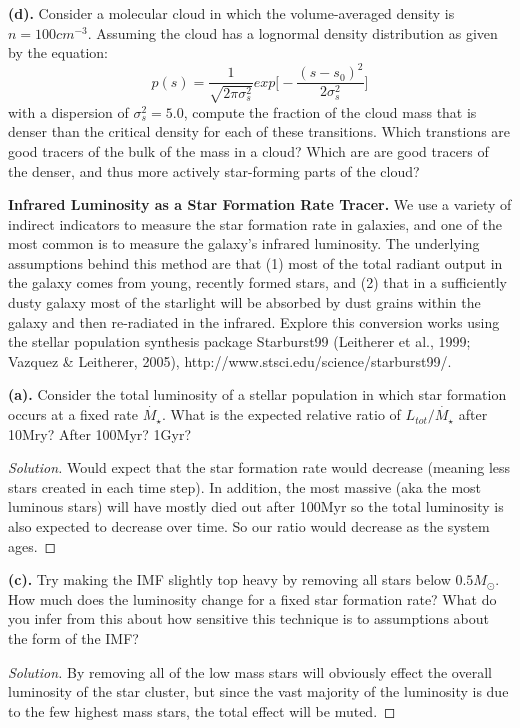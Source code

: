 \documentclass[10pt]{article}
\newenvironment{problem}[2][Problem]{\begin{trivlist}
\item[\hskip \labelsep {\bfseries #1}\hskip \labelsep {\bfseries #2.}]}{\end{trivlist}}
\begin{document}
\noindent\textbf{(d).} Consider a molecular cloud in which the volume-averaged density is $n=100 cm^{-3}$. Assuming the cloud has a lognormal density distribution as given by the equation: 
\begin{equation}
p(s) = \frac{1}{\sqrt{2\pi\sigma_{s}^2}}exp\bigg[-\frac{(s-s_{0})^2}{2\sigma_{s}^2}\bigg]
\end{equation}
with a dispersion of $\sigma_{s}^2 = 5.0$, compute the fraction of the cloud mass that is denser than the critical density for each of these transitions. Which transtions are good tracers of the bulk of the mass in a cloud? Which are are good tracers of the denser, and thus more actively star-forming parts of the cloud?

\begin{problem}{1.2}
\textbf{Infrared Luminosity as a Star Formation Rate Tracer.}
We use a variety of indirect indicators to measure the star formation rate in galaxies, and one of the most common is to measure the galaxy's infrared luminosity. The underlying assumptions behind this method are that (1) most of the total radiant output in the galaxy comes from young, recently formed stars, and (2) that in a sufficiently dusty galaxy most of the starlight will be absorbed by dust grains within the galaxy and then re-radiated in the infrared. Explore this conversion works using the stellar population synthesis package Starburst99 (Leitherer et al., 1999; Vazquez \& Leitherer, 2005), http://www.stsci.edu/science/starburst99/.
\end{problem}

\noindent\textbf{(a).}
Consider the total luminosity of a stellar population in which star formation occurs at a fixed rate $\dot{M_{\star}}$. What is the expected relative ratio of $L_{tot}/\dot{M_{\star}}$ after 10Mry? After 100Myr? 1Gyr?
\begin{proof}[Solution]
Would expect that the star formation rate would decrease (meaning less stars created in each time step). In addition, the most massive (aka the most luminous stars) will have mostly died out after 100Myr so the total luminosity is also expected to decrease over time. So our ratio would decrease as the system ages.
\end{proof}

\noindent\textbf{(c).}
Try making the IMF slightly top heavy by removing all stars below $0.5M_{\odot}$. How much does the luminosity change for a fixed star formation rate? What do you infer from this about how sensitive this technique is to assumptions about the form of the IMF?
\begin{proof}[Solution]
By removing all of the low mass stars will obviously effect the overall luminosity of the star cluster, but since the vast majority of the luminosity is due to the few highest mass stars, the total effect will be muted. 
\end{proof}
\end{document}
